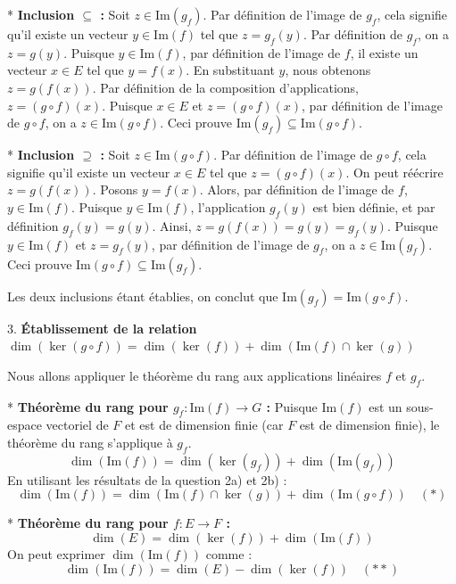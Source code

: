 \documentclass{report}
\begin{document}
        *   \textbf{Inclusion $\subseteq$ :}
            Soit $z \in \text{Im}(g_f)$. Par définition de l'image de $g_f$, cela signifie qu'il existe un vecteur $y \in \text{Im}(f)$ tel que $z = g_f(y)$.
            Par définition de $g_f$, on a $z = g(y)$.
            Puisque $y \in \text{Im}(f)$, par définition de l'image de $f$, il existe un vecteur $x \in E$ tel que $y = f(x)$.
            En substituant $y$, nous obtenons $z = g(f(x))$.
            Par définition de la composition d'applications, $z = (g \circ f)(x)$.
            Puisque $x \in E$ et $z = (g \circ f)(x)$, par définition de l'image de $g \circ f$, on a $z \in \text{Im}(g \circ f)$.
            Ceci prouve $\text{Im}(g_f) \subseteq \text{Im}(g \circ f)$.

        *   \textbf{Inclusion $\supseteq$ :}
            Soit $z \in \text{Im}(g \circ f)$. Par définition de l'image de $g \circ f$, cela signifie qu'il existe un vecteur $x \in E$ tel que $z = (g \circ f)(x)$.
            On peut réécrire $z = g(f(x))$.
            Posons $y = f(x)$. Alors, par définition de l'image de $f$, $y \in \text{Im}(f)$.
            Puisque $y \in \text{Im}(f)$, l'application $g_f(y)$ est bien définie, et par définition $g_f(y) = g(y)$.
            Ainsi, $z = g(f(x)) = g(y) = g_f(y)$.
            Puisque $y \in \text{Im}(f)$ et $z = g_f(y)$, par définition de l'image de $g_f$, on a $z \in \text{Im}(g_f)$.
            Ceci prouve $\text{Im}(g \circ f) \subseteq \text{Im}(g_f)$.

        Les deux inclusions étant établies, on conclut que $\text{Im}(g_f) = \text{Im}(g \circ f)$.

3.  \textbf{Établissement de la relation $\dim(\ker(g \circ f)) = \dim(\ker(f)) + \dim(\text{Im}(f) \cap \ker(g))$}

    Nous allons appliquer le théorème du rang aux applications linéaires $f$ et $g_f$.

    *   \textbf{Théorème du rang pour $g_f: \text{Im}(f) \to G$ :}
        Puisque $\text{Im}(f)$ est un sous-espace vectoriel de $F$ et est de dimension finie (car $F$ est de dimension finie), le théorème du rang s'applique à $g_f$.
        $$ \dim(\text{Im}(f)) = \dim(\ker(g_f)) + \dim(\text{Im}(g_f)) $$
        En utilisant les résultats de la question 2a) et 2b) :
        $$ \dim(\text{Im}(f)) = \dim(\text{Im}(f) \cap \ker(g)) + \dim(\text{Im}(g \circ f)) \quad (*)$$

    *   \textbf{Théorème du rang pour $f: E \to F$ :}
        $$ \dim(E) = \dim(\ker(f)) + \dim(\text{Im}(f)) $$
        On peut exprimer $\dim(\text{Im}(f))$ comme :
        $$ \dim(\text{Im}(f)) = \dim(E) - \dim(\ker(f)) \quad (**) $$
\end{document}
